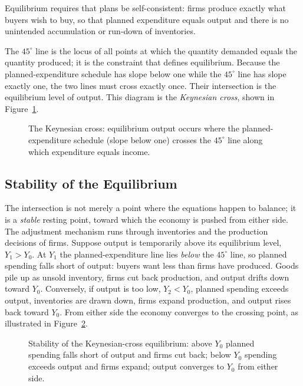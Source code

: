 Equilibrium requires that plans be self-consistent: firms produce exactly what buyers wish to buy, so that planned expenditure equals output and there is no unintended accumulation or run-down of inventories.


The $45^\circ$ line is the locus of all points at which the quantity demanded equals the quantity produced; it is the constraint that defines equilibrium. Because the planned-expenditure schedule has slope below one while the $45^\circ$ line has slope exactly one, the two lines must cross exactly once. Their intersection is the equilibrium level of output. This diagram is the \emph{Keynesian cross}, shown in Figure~\ref{fig:macro-12}.

\begin{figure}[h]
\centering

\caption{The Keynesian cross: equilibrium output occurs where the planned-expenditure schedule (slope below one) crosses the $45^\circ$ line along which expenditure equals income.}
\label{fig:macro-12}
\end{figure}

\subsection{Stability of the Equilibrium}

The intersection is not merely a point where the equations happen to balance; it is a \emph{stable} resting point, toward which the economy is pushed from either side. The adjustment mechanism runs through inventories and the production decisions of firms. Suppose output is temporarily above its equilibrium level, $Y_1 > Y_0$. At $Y_1$ the planned-expenditure line lies \emph{below} the $45^\circ$ line, so planned spending falls short of output: buyers want less than firms have produced. Goods pile up as unsold inventory, firms cut back production, and output drifts down toward $Y_0$. Conversely, if output is too low, $Y_2 < Y_0$, planned spending exceeds output, inventories are drawn down, firms expand production, and output rises back toward $Y_0$. From either side the economy converges to the crossing point, as illustrated in Figure~\ref{fig:macro-13}.

\begin{figure}[h]
\centering

\caption{Stability of the Keynesian-cross equilibrium: above $Y_0$ planned spending falls short of output and firms cut back; below $Y_0$ spending exceeds output and firms expand; output converges to $Y_0$ from either side.}
\label{fig:macro-13}
\end{figure}

